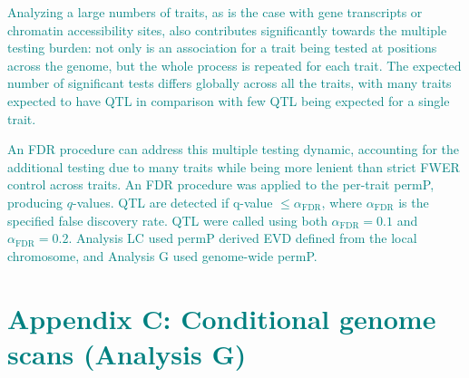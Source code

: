 \documentclass[9pt,twocolumn,twoside]{gsajnl}
\newcommand{\GKinline}[1]{\textcolor{teal}{#1}}
\begin{document}

\GKinline{Analyzing a large numbers of traits, as is the case with gene transcripts or chromatin accessibility sites, also contributes significantly towards the multiple testing burden: not only is an association for a trait being tested at positions across the genome, but the whole process is repeated for each trait. The expected number of significant tests differs globally across all the traits, with many traits expected to have QTL in comparison with few QTL being expected for a single trait.}

\GKinline{An FDR procedure can address this multiple testing dynamic, accounting for the additional testing due to many traits while being more lenient than strict FWER control across traits. An FDR procedure \citep{Benjamini1995,Storey2003} was applied to the per-trait permP, producing $q$-values. QTL are detected if q-value $\le \alpha_{\text{FDR}}$, where $\alpha_{\text{FDR}}$ is the specified false discovery rate. QTL were called using both $\alpha_{\text{FDR}} = 0.1$ and $\alpha_{\text{FDR}} = 0.2$. Analysis LC used permP derived EVD defined from the local chromosome, and Analysis G used genome-wide permP.}


\section{\GKinline{Appendix C: Conditional genome scans (Analysis G)}}
\end{document}
